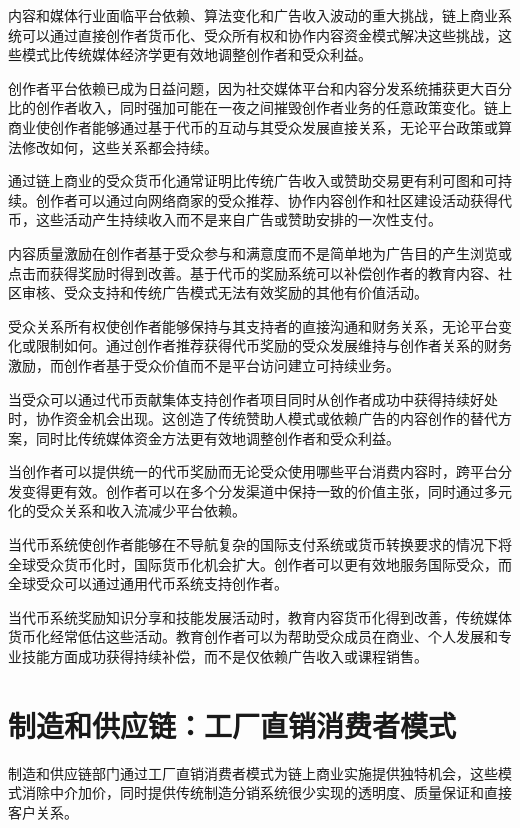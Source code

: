 \documentclass[
  Letterpaper,
]{scrbook}
\begin{document}
内容和媒体行业面临平台依赖、算法变化和广告收入波动的重大挑战，链上商业系统可以通过直接创作者货币化、受众所有权和协作内容资金模式解决这些挑战，这些模式比传统媒体经济学更有效地调整创作者和受众利益。

创作者平台依赖已成为日益问题，因为社交媒体平台和内容分发系统捕获更大百分比的创作者收入，同时强加可能在一夜之间摧毁创作者业务的任意政策变化。链上商业使创作者能够通过基于代币的互动与其受众发展直接关系，无论平台政策或算法修改如何，这些关系都会持续。

通过链上商业的受众货币化通常证明比传统广告收入或赞助交易更有利可图和可持续。创作者可以通过向网络商家的受众推荐、协作内容创作和社区建设活动获得代币，这些活动产生持续收入而不是来自广告或赞助安排的一次性支付。

内容质量激励在创作者基于受众参与和满意度而不是简单地为广告目的产生浏览或点击而获得奖励时得到改善。基于代币的奖励系统可以补偿创作者的教育内容、社区审核、受众支持和传统广告模式无法有效奖励的其他有价值活动。

受众关系所有权使创作者能够保持与其支持者的直接沟通和财务关系，无论平台变化或限制如何。通过创作者推荐获得代币奖励的受众发展维持与创作者关系的财务激励，而创作者基于受众价值而不是平台访问建立可持续业务。

当受众可以通过代币贡献集体支持创作者项目同时从创作者成功中获得持续好处时，协作资金机会出现。这创造了传统赞助人模式或依赖广告的内容创作的替代方案，同时比传统媒体资金方法更有效地调整创作者和受众利益。

当创作者可以提供统一的代币奖励而无论受众使用哪些平台消费内容时，跨平台分发变得更有效。创作者可以在多个分发渠道中保持一致的价值主张，同时通过多元化的受众关系和收入流减少平台依赖。

当代币系统使创作者能够在不导航复杂的国际支付系统或货币转换要求的情况下将全球受众货币化时，国际货币化机会扩大。创作者可以更有效地服务国际受众，而全球受众可以通过通用代币系统支持创作者。

当代币系统奖励知识分享和技能发展活动时，教育内容货币化得到改善，传统媒体货币化经常低估这些活动。教育创作者可以为帮助受众成员在商业、个人发展和专业技能方面成功获得持续补偿，而不是仅依赖广告收入或课程销售。

\section{制造和供应链：工厂直销消费者模式}\label{ux5236ux9020ux548cux4f9bux5e94ux94feux5de5ux5382ux76f4ux9500ux6d88ux8d39ux8005ux6a21ux5f0f}

制造和供应链部门通过工厂直销消费者模式为链上商业实施提供独特机会，这些模式消除中介加价，同时提供传统制造分销系统很少实现的透明度、质量保证和直接客户关系。
\end{document}
